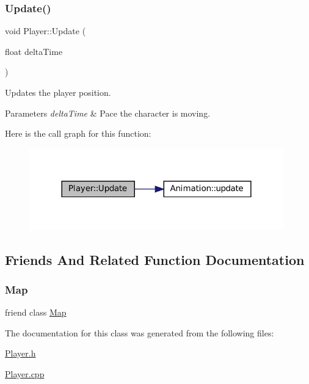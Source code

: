 \subsubsection{\texorpdfstring{Update()}{Update()}}
{\footnotesize\ttfamily void Player\+::\+Update (\begin{DoxyParamCaption}\item[{float}]{delta\+Time }\end{DoxyParamCaption})}



Updates the player position. 


\begin{DoxyParams}{Parameters}
{\em delta\+Time} & Pace the character is moving. \\
\hline
\end{DoxyParams}
Here is the call graph for this function\+:
\nopagebreak
\begin{figure}[H]
\begin{center}
\leavevmode
\includegraphics[width=312pt]{classPlayer_ae6b2acaf61aae4df8e10f50ebbdf664d_cgraph}
\end{center}
\end{figure}


\subsection{Friends And Related Function Documentation}
\mbox{\label{classPlayer_ad2f32e921244459f7cc6d50355429cc6}} 
\subsubsection{\texorpdfstring{Map}{Map}}
{\footnotesize\ttfamily friend class \mbox{\hyperlink{classMap}{Map}}\hspace{0.3cm}{\ttfamily [friend]}}



The documentation for this class was generated from the following files\+:\begin{DoxyCompactItemize}
\item 
\mbox{\hyperlink{Player_8h}{Player.\+h}}\item 
\mbox{\hyperlink{Player_8cpp}{Player.\+cpp}}\end{DoxyCompactItemize}
